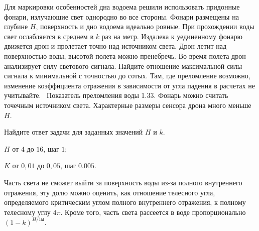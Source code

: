 
Для маркировки особенностей дна водоема решили
использовать придонные фонари,
излучающие свет однородно во все стороны. Фонари размещены на глубине $H$,
поверхность и дно водоема идеально ровные. При прохождении воды свет ослабляется в
среднем в $k$ раз на метр. Издалека к уединенному фонарю движется дрон и пролетает точно 
над источником света. Дрон летит над поверхностью воды, высотой полета можно пренебречь. 
Во время полета дрон анализирует силу светового сигнала. Найдите отношение максимальной силы сигнала к
минимальной с точностью до сотых. Там, где преломление возможно, изменение
коэффициента отражения в зависимости от угла падения в расчетах не учитывайте.
 Показатель преломления воды 1.33. Фонарь
можно считать точечным источником света. Характерные размеры сенсора дрона много меньше $H$.         

Найдите ответ задачи для заданных значений $H$ и $k$.

\paramSection

$H$ от $4$ до $16$, шаг $1$;

$K$ от $0,01$ до $0,05$, шаг $0.005$.

\solutionSection

Часть света не сможет выйти за поверхность воды из-за полного внутреннего отражения, эту долю можно оценить, 
как отношение телесного угла, определяемого критическим углом полного внутреннего отражения, к полному телесному углу $4\pi$.  
Кроме того, часть света рассеется в воде пропорционально $(1-k)^{H/1\text{м}}$.

